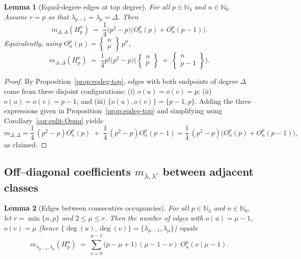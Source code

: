 \documentclass[letterpaper,12pt]{article}
\newtheorem{lemma}{Lemma}
\begin{document}
\begin{lemma}[Equal-degree edges at top degree]
\label{lem:eqdeg-top}
For all $p \in \mathbb{N}_3$ and $n \in \mathbb{N}_0$. Assume $r=p$ so that $\lambda_{p-1}=\lambda_p=\Delta$.
Then
\begin{equation}
    m_{\Delta,\Delta}(H_p^n)
\;=\;
\frac14\Big(p^2-p\Big)\Big( O_n^p(p)+O_n^p(p-1)\Big).
\end{equation}
Equivalently, using $O_n^p(\mu)=\begin{Bmatrix} n \\ \mu \end{Bmatrix}\,p^{\underline{\mu}}$,
\begin{equation}
    m_{\Delta,\Delta}(H_p^n)
\;=\;
\frac14p!\Big(p^2-p\Big)\Big(
\begin{Bmatrix} n \\ p \end{Bmatrix}
\;+\;
\begin{Bmatrix} n \\ p-1 \end{Bmatrix}
\Big).
\end{equation}
\end{lemma}

\begin{proof}
By Proposition~\ref{prop:eqdeg-top}, edges with both endpoints of
degree $\Delta$ come from three disjoint configurations:
(i) $o(u)=o(v)=p$;
(ii) $o(u)=o(v)=p-1$; and
(iii) $\{o(u),o(v)\}=\{p-1,p\}$.
Adding the three expressions given in Proposition~\ref{prop:eqdeg-top} and simplifying using
Corollary~\ref{cor:split-Opnu} yields
\[
m_{\Delta,\Delta}
= \frac14\,(p^2-p)O_n^p(p) \;+\; \frac14\,(p^2-p)O_n^p(p-1)
= \frac14\,(p^2-p)\Big(O_n^p(p)+O_n^p(p-1)\Big),
\]
as claimed.
\end{proof}

\subsection*{Off–diagonal coefficients $m_{\lambda,\lambda'}$ between adjacent classes}

\begin{lemma}[Edges between consecutive occupancies]
\label{lem:offdiag-general}
For all $p \in \mathbb{N}_3$ and $n \in \mathbb{N}_0$,  let $r = \min\{n, p\}$ and  $2\le \mu\le r$. Then the number of edges with
$o(u)=\mu-1$, $o(v)=\mu$ (hence $\{\deg(u),\deg(v)\}=\{\lambda_{\mu-1},\lambda_\mu\}$)
equals
\begin{equation}
    m_{\lambda_{\mu-1},\lambda_\mu}(H_p^n)
\;=\;
\sum_{\nu=0}^{\mu-1}\big(p-\mu+1\big)\,(\mu-1-\nu)\; O_n^p(\nu\mid \mu-1).
\end{equation}
\end{lemma}
\end{document}
